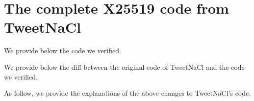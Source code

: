 \section{The complete X25519 code from TweetNaCl}
\label{verified-C-and-diff}

 We provide below the code we verified.



 We provide below the diff between the original code of TweetNaCl and the code we verified.



As follow, we provide the explanations of the above changes to TweetNaCl's code.

